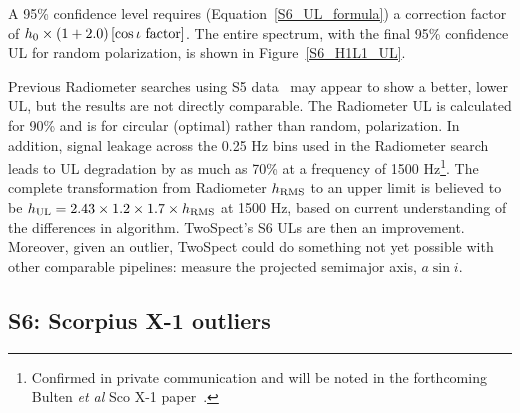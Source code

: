 A 95\% confidence level requires (Equation~\ref{S6_UL_formula}) a correction factor of $h_0 \times \left(1+2.0 \right) \left[\cos \iota \textup{ factor} \right]$.
The entire spectrum, with the final 95\% confidence UL for random polarization, is shown in Figure~\ref{S6_H1L1_UL}.

Previous Radiometer searches using S5 data~\cite{AbadieStoch2011} may appear to show a better, lower UL, but the results are not directly comparable.
The Radiometer UL is calculated for 90\% and is for circular (optimal) rather than random, polarization.
In addition, signal leakage across the 0.25 Hz bins used in the Radiometer search leads to UL degradation by as much as 70\% at a frequency of 1500 Hz\footnote{Confirmed in private communication and will be noted in the forthcoming Bulten \textit{et al} Sco X-1 paper~\cite{ScoX1MDC2014DCC}.}.
The complete transformation from Radiometer $h_\textup{RMS}$ to an upper limit is believed to be $h_\textup{UL} = 2.43\times1.2\times1.7\times h_\textup{RMS}$ at 1500 Hz, based on current understanding of the differences in algorithm.
TwoSpect's S6 ULs are then an improvement.
Moreover, given an outlier, TwoSpect could do something not yet possible with other comparable pipelines: measure the projected semimajor axis, $a \sin i$.

\subsection{S6: Scorpius X-1 outliers}

